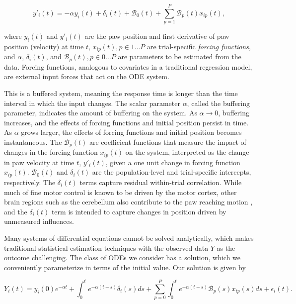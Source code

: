 \documentclass[preprint]{JASA}
\begin{document}
\begin{equation}
\label{eq:flode_deriv}
y'_i(t) = -\alpha y_i(t) + \delta_i(t) + \mathcal{B}_0(t) + \sum_{p = 1}^P \mathcal{B}_p(t) x_{ip}(t),
\end{equation}

\noindent where \(y_i(t)\) and \(y'_i(t)\) are the paw position and
first derivative of paw position (velocity) at time \(t\),
\(x_{ip}(t), p \in 1\ldots P\) are trial-specific \emph{forcing
functions}, and \(\alpha\), \(\delta_i(t)\), and
\(\mathcal{B}_p(t), p\in 0\ldots P\) are parameters to be estimated from
the data. Forcing functions, analogous to covariates in a traditional
regression model, are external input forces that act on the ODE system.

This is a buffered system, meaning the response time is longer than the
time interval in which the input changes. The scalar parameter
\(\alpha\), called the buffering parameter, indicates the amount of
buffering on the system. As \(\alpha \to 0\), buffering increases, and
the effects of forcing functions and initial position persist in time.
As \(\alpha\) grows larger, the effects of forcing functions and initial
position becomes instantaneous. The \(\mathcal{B}_p(t)\) are coefficient
functions that measure the impact of changes in the forcing function
\(x_{ip}(t)\) on the system, interpreted as the change in paw velocity
at time \(t\), \(y'_i(t)\), given a one unit change in forcing function
\(x_{ip}(t)\). \(\mathcal{B}_0(t)\) and \(\delta_i(t)\) are the
population-level and trial-specific intercepts, respectively. The
\(\delta_i(t)\) terms capture residual within-trial correlation. While
much of fine motor control is known to be driven by the motor cortex,
other brain regions such as the cerebellum also contribute to the paw
reaching motion \citep{becker2020}, and the \(\delta_i(t)\) term is
intended to capture changes in position driven by unmeasured influences.

Many systems of differential equations cannot be solved analytically,
which makes traditional statistical estimation techniques with the
observed data \(Y\) as the outcome challenging. The class of ODEs we
consider has a solution, which we conveniently parameterize in terms of
the initial value. Our solution is given by

\begin{equation}
\label{eq:flode_mod}    
    Y_i(t) = y_i(0)e^{-\alpha t} + \int_0^t e^{-\alpha (t-s)}\delta_i(s)ds + \sum_{p=0}^P\int_0^t e^{-\alpha (t-s)} \mathcal{B}_p(s)x_{ip}(s)ds + \epsilon_i(t).
\end{equation}
\end{document}
